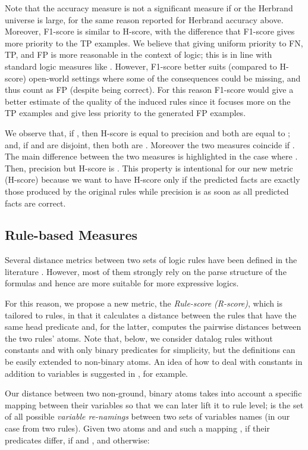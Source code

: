 \documentclass[letterpaper]{article} \usepackage{aaai20}  \usepackage{times}  \usepackage{helvet} \usepackage{courier}  \usepackage[hyphens]{url}  \usepackage{graphicx} \urlstyle{rm} \def\UrlFont{\rm}  \usepackage{graphicx}  \frenchspacing  \setlength{\pdfpagewidth}{8.5in}  \setlength{\pdfpageheight}{11in}  \usepackage{amsthm}
\theoremstyle{definition}
\begin{document}
Note that the accuracy measure is not a significant measure if  or the Herbrand universe is large, for the same reason reported for Herbrand accuracy above. 
Moreover, F1-score is similar to H-score, with the difference that F1-score gives more priority to the TP examples. We believe that giving uniform priority to FN, TP, and FP is more reasonable in the context of logic; this is in line with standard logic measures like . However, F1-score better suits (compared to H-score) open-world settings where some of the consequences could be missing, and thus count as FP (despite being correct). For this reason F1-score would give a better estimate of the quality of the induced rules since it focuses more on the TP examples and give less priority to the generated FP examples.

We observe that, if , then H-score is equal to precision and both are equal to ; and, if  and  are disjoint, then both are . Moreover the two measures coincide if . 
The main difference between the two measures is highlighted in the case where . 
Then, precision  but H-score is . This property is intentional for our new metric (H-score) because we want to have H-score  only if the predicted facts are exactly those
produced by the original rules while precision is  as soon as all predicted facts are correct.


\subsection{Rule-based Measures}
Several distance metrics between two sets of logic rules have been defined in the literature \cite{dist_1,dist_2,dist_3,dist_4,dist_5}. 
However, most of them strongly rely on the parse structure of the formulas and hence are more suitable for more expressive logics. 

For this reason, we propose a new metric, the \emph{Rule-score (R-score)}, which is tailored to rules, in that it calculates a distance  between the rules that have the same head predicate and, for the latter, computes the pairwise distances  between the two rules' atoms. Note that, below, we consider datalog rules without constants and with only binary predicates for simplicity, but the definitions can be easily extended to non-binary atoms. 
An idea of how to deal with constants in addition to variables is suggested in \cite{dist_2}, for example.



Our distance  between two non-ground, binary atoms takes into account a specific mapping  between their variables so that we can later lift it to rule level;
 is the set of all possible \emph{variable re-namings} between two sets of variables names (in our case from two rules). 
Given two atoms  and  and such a mapping ,   if their predicates differ,  if 
 and 
, and otherwise:
\end{document}

